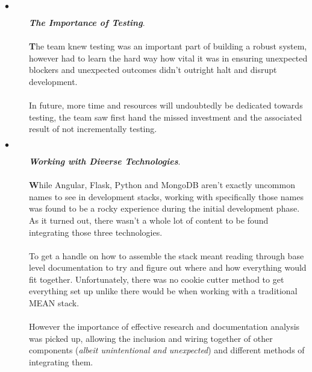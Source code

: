 \begin{description}
  \item[$\bullet$] \textit{\textbf{The Importance of Testing}}.
  
  \paragraph{}
  \textbf{T}he team knew testing was an important part of building a robust system, however had to learn the hard way how vital it was in ensuring unexpected blockers and unexpected outcomes didn't outright halt and disrupt development.
  
  \paragraph{}
  In future, more time and resources will undoubtedly be dedicated towards testing, the team saw first hand the missed investment and the associated result of not incrementally testing.
  
  \item[$\bullet$] \textit{\textbf{Working with Diverse Technologies}}.
  
  \paragraph{}
  \textbf{W}hile Angular, Flask, Python and MongoDB aren't exactly uncommon names to see in development stacks, working with specifically those names was found to be a rocky experience during the initial development phase. As it turned out, there wasn't a whole lot of content to be found integrating those three technologies.
  
  \paragraph{}
  To get a handle on how to assemble the stack meant reading through base level documentation to try and figure out where and how everything would fit together. Unfortunately, there was no cookie cutter method to get everything set up unlike there would be when working with a traditional MEAN stack. 
  
  \paragraph{}
  However the importance of effective research and documentation analysis was picked up, allowing the inclusion and wiring together of other components (\textit{albeit unintentional and unexpected}) and different methods of integrating them.


\end{description}

